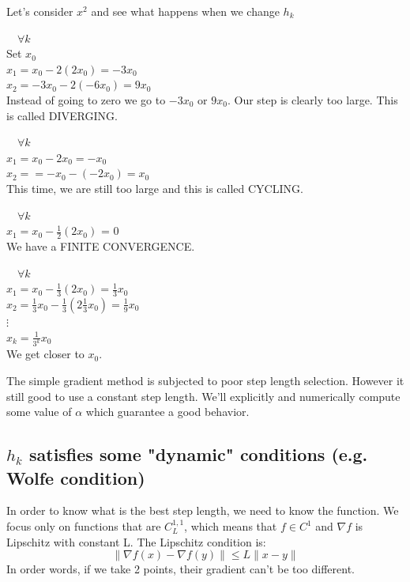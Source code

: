 \begin{example}\begin{leftbar}
Let's consider $x^2$ and see what happens when we change $h_k$

 $\quad \forall k$ \\
Set $x_0$ \\
$x_1 = x_0 - 2(2x_0) = -3x_0$\\
$x_2 = -3x_0 - 2(-6x_0) = 9 x_0$\\
Instead of going to zero we go to $-3x_0$ or $9x_0$. Our step is clearly too large. This is called DIVERGING.

 $\quad \forall k$ \\
$x_1 = x_0 - 2x_0 = -x_0$\\
$x_2 = = -x_0 - (-2x_0) = x_0$ \\
This time, we are still too large and this is called CYCLING. 

 $\quad \forall k$ \\
$x_1 = x_0 - \frac{1}{2}(2x_0)$ = 0 \\
We have a FINITE CONVERGENCE. 

 $\quad \forall k$ \\
$x_1 = x_0 - \frac{1}{3}(2x_0) = \frac{1}{3}x_0$\\
$x_2 = \frac{1}{3}x_0 - \frac{1}{3}(2\frac{1}{3}x_0) = \frac{1}{9}x_0$\\
$\vdots$\\
$x_k = \frac{1}{3^k}x_0$ \\

We get closer to $x_0$. 

\end{leftbar}\end{example}

The simple gradient method is subjected to poor step length selection. However it still good to use a constant step length. We'll explicitly and numerically compute some value of $\alpha$ which guarantee a good behavior. 

\subsection{$h_k$ satisfies some "dynamic" conditions (e.g. Wolfe condition)}

In order to know what is the best step length, we need to know the function. We focus only on functions that are $C_L^{1,1}$, which means that $f \in C^1$ and $\nabla f$ is Lipschitz with constant L. The Lipschitz condition is:
$$\| \nabla f(x) - \nabla f(y) \| \leq L \| x-y \|$$
In order words, if we take 2 points, their gradient can't be too different.\\

